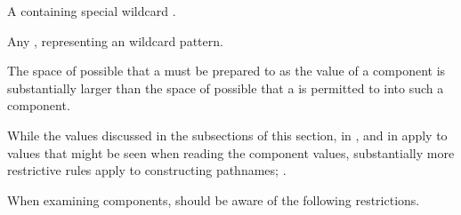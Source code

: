\itemitem{\bull} A  containing  
		 special wildcard .
 
\itemitem{\bull} Any ,
		 representing an  wildcard pattern.

\endlist 

\endsubsubsection%


  
The space of possible  that a  
must be prepared to  
as the value of a  component
is substantially larger than the space of possible  
that a  is permitted to 
into such a component.

While the values discussed 
    in the subsections of this section,
    in {\secref\SpecialComponentValues},
and in {\secref\WildcardRestrictions} 
apply to values that might be seen when 
reading the component values,
substantially more restrictive rules apply to constructing pathnames;
\seesection\ConstructingPathnames.

When examining  components,
 should be aware of the following restrictions.

% 
%   
%   
%   
%   
%   
% 


